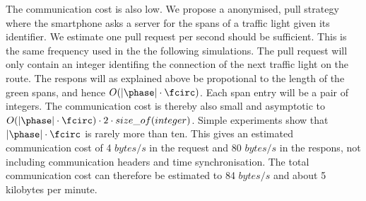 The communication cost is also low.
We propose a anonymised, pull strategy where the smartphone asks a server for the spans of a traffic light given its identifier.
We estimate one pull request per second should be sufficient.
This is the same frequency used in the the following simulations.
The pull request will only contain an integer identifing the connection of the next traffic light on the route.
The respons will as explained above be propotional to the length of the green spans, and hence $O(|\phase|\cdot \fcirc)$.
Each span entry will be a pair of integers.
The communication cost is thereby also small and asymptotic to $O(|\phase|\cdot \fcirc)\cdot 2\cdot size\_of(integer)$. %
Simple experiments show that $|\phase|\cdot \fcirc$ is rarely more than ten. 
This gives an estimated communication cost of 4 $bytes/s$ in the request and 80 $bytes/s$ in the respons, not including communication headers and time synchronisation.
The total communication cost can therefore be estimated to 84 $bytes/s$ and about 5 kilobytes per minute.





